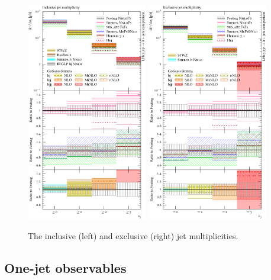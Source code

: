 \begin{figure}[t!]
  \centering
  \includegraphics[width=0.47\textwidth]{figures/hjetscomp_NJet_incl_30.pdf}
  \quad
  \includegraphics[width=0.47\textwidth]{figures/hjetscomp_NJet_excl_30.pdf}
  \caption{
    The inclusive (left) and exclusive (right) jet multiplicities.
    \label{fig:higgscomp:results:inclobs:njets}
  }
\end{figure}

\subsection{One-jet observables}
\label{sec:hjetscomp:results:1jobs}


